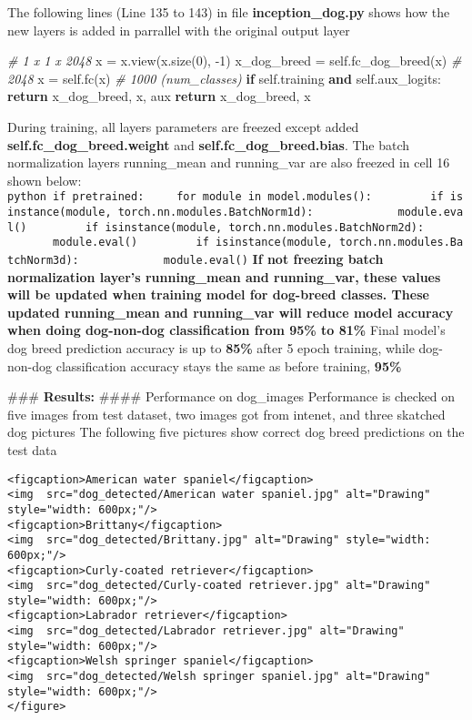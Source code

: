 \documentclass[11pt]{article}
\newenvironment{Shaded}{}{}
\newcommand{\KeywordTok}[1]{\textcolor[rgb]{0.00,0.44,0.13}{\textbf{{#1}}}}
\newcommand{\DecValTok}[1]{\textcolor[rgb]{0.25,0.63,0.44}{{#1}}}
\newcommand{\CommentTok}[1]{\textcolor[rgb]{0.38,0.63,0.69}{\textit{{#1}}}}
\newcommand{\NormalTok}[1]{{#1}}
\newcommand{\VariableTok}[1]{\textcolor[rgb]{0.10,0.09,0.49}{{#1}}}
\newcommand{\ControlFlowTok}[1]{\textcolor[rgb]{0.00,0.44,0.13}{\textbf{{#1}}}}
\newcommand{\OperatorTok}[1]{\textcolor[rgb]{0.40,0.40,0.40}{{#1}}}
\begin{document}
The following lines (Line 135 to 143) in file \textbf{inception\_dog.py}
shows how the new layers is added in parrallel with the original output
layer

\begin{Shaded}
\begin{Highlighting}[]
\CommentTok{# 1 x 1 x 2048}
\NormalTok{x }\OperatorTok{=}\NormalTok{ x.view(x.size(}\DecValTok{0}\NormalTok{), }\OperatorTok{-}\DecValTok{1}\NormalTok{)}
\NormalTok{x_dog_breed }\OperatorTok{=} \VariableTok{self}\NormalTok{.fc_dog_breed(x)           }
\CommentTok{# 2048}
\NormalTok{x }\OperatorTok{=} \VariableTok{self}\NormalTok{.fc(x)   }
\CommentTok{# 1000 (num_classes)}
\ControlFlowTok{if} \VariableTok{self}\NormalTok{.training }\KeywordTok{and} \VariableTok{self}\NormalTok{.aux_logits:}
    \ControlFlowTok{return}\NormalTok{ x_dog_breed, x, aux }
\ControlFlowTok{return}\NormalTok{ x_dog_breed, x}
\end{Highlighting}
\end{Shaded}

During training, all layers parameters are freezed except added
\textbf{self.fc\_dog\_breed.weight} and
\textbf{self.fc\_dog\_breed.bias}. The batch normalization layers
running\_mean and running\_var are also freezed in cell 16 shown below:
\texttt{python\ if\ pretrained:\ \ \ \ \ for\ module\ in\ model.modules():\ \ \ \ \ \ \ \ \ if\ isinstance(module,\ torch.nn.modules.BatchNorm1d):\ \ \ \ \ \ \ \ \ \ \ \ \ module.eval()\ \ \ \ \ \ \ \ \ if\ isinstance(module,\ torch.nn.modules.BatchNorm2d):\ \ \ \ \ \ \ \ \ \ \ \ \ module.eval()\ \ \ \ \ \ \ \ \ if\ isinstance(module,\ torch.nn.modules.BatchNorm3d):\ \ \ \ \ \ \ \ \ \ \ \ \ module.eval()}
\textbf{If not freezing batch normalization layer's running\_mean and
running\_var, these values will be updated when training model for
dog-breed classes. These updated running\_mean and running\_var will
reduce model accuracy when doing dog-non-dog classification from 95\% to
81\%} Final model's dog breed prediction accuracy is up to \textbf{85\%}
after 5 epoch training, while dog-non-dog classification accuracy stays
the same as before training, \textbf{95\%}

\#\#\# \textbf{Results:} \#\#\#\# Performance on dog\_images Performance
is checked on five images from test dataset, two images got from
intenet, and three skatched dog pictures The following five pictures
show correct dog breed predictions on the test data

\begin{verbatim}
<figcaption>American water spaniel</figcaption>
<img  src="dog_detected/American water spaniel.jpg" alt="Drawing" style="width: 600px;"/>
<figcaption>Brittany</figcaption>
<img  src="dog_detected/Brittany.jpg" alt="Drawing" style="width: 600px;"/>
<figcaption>Curly-coated retriever</figcaption>
<img  src="dog_detected/Curly-coated retriever.jpg" alt="Drawing" style="width: 600px;"/> 
<figcaption>Labrador retriever</figcaption>
<img  src="dog_detected/Labrador retriever.jpg" alt="Drawing" style="width: 600px;"/> 
<figcaption>Welsh springer spaniel</figcaption>
<img  src="dog_detected/Welsh springer spaniel.jpg" alt="Drawing" style="width: 600px;"/>     
</figure>  
\end{verbatim}
\end{document}
